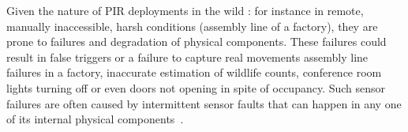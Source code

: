 %
Given the nature of PIR deployments in the wild : for instance in remote, manually inaccessible, harsh conditions (\eg assembly line of a factory), they are prone to failures and degradation of physical components.
%
%
%
These failures could result in false triggers or a failure to capture real movements \eg assembly line failures in a factory, inaccurate estimation of wildlife counts, conference room lights turning off or even doors not opening in spite of occupancy.
%
Such sensor failures are often caused by intermittent sensor faults that can happen in any one of its internal physical components~\cite{chakraborty2018fall,marathe2021currentsense}.
%






